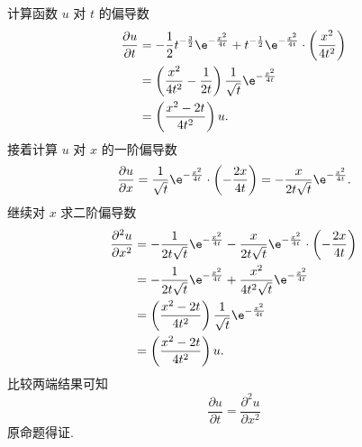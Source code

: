 \begin{myproof}
    计算函数 $u$ 对 $t$ 的偏导数
    \begin{equation}
        \begin{aligned}
            \frac{\partial u}{\partial t} & = -\frac{1}{2} t^{-\frac{3}{2}} \e^{-\frac{x^2}{4t}} + t^{-\frac{1}{2}} \e^{-\frac{x^2}{4t}} \cdot \left( \frac{x^2}{4t^2} \right) \\
                                          & = \left( \frac{x^2}{4t^2} - \frac{1}{2t} \right) \frac{1}{\sqrt{t}} \e^{-\frac{x^2}{4t}}                                           \\
                                          & = \left( \frac{x^2 - 2t}{4t^2} \right) u.
        \end{aligned}
    \end{equation}
    接着计算 $u$ 对 $x$ 的一阶偏导数
    \begin{equation}
        \frac{\partial u}{\partial x} = \frac{1}{\sqrt{t}} \e^{-\frac{x^2}{4t}} \cdot \left( -\frac{2x}{4t} \right) = -\frac{x}{2t\sqrt{t}} \e^{-\frac{x^2}{4t}}.
    \end{equation}
    继续对 $x$ 求二阶偏导数
    \begin{equation}
        \begin{aligned}
            \frac{\partial^2 u}{\partial x^2} & = -\frac{1}{2t\sqrt{t}} \e^{-\frac{x^2}{4t}} - \frac{x}{2t\sqrt{t}} \e^{-\frac{x^2}{4t}} \cdot \left( -\frac{2x}{4t} \right) \\
                                              & = -\frac{1}{2t\sqrt{t}} \e^{-\frac{x^2}{4t}} + \frac{x^2}{4t^2\sqrt{t}} \e^{-\frac{x^2}{4t}}                                 \\
                                              & = \left( \frac{x^2 - 2t}{4t^2} \right) \frac{1}{\sqrt{t}} \e^{-\frac{x^2}{4t}}                                               \\
                                              & = \left( \frac{x^2 - 2t}{4t^2} \right) u.
        \end{aligned}
    \end{equation}
    比较两端结果可知
    \begin{equation}
        \boxed{\frac{\partial u}{\partial t} = \frac{\partial^2 u}{\partial x^2}}
    \end{equation}
    原命题得证.
\end{myproof}


